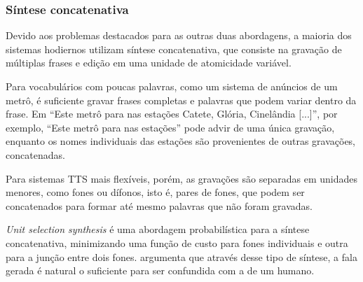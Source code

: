 
\subsubsection{Síntese concatenativa}
Devido aos problemas destacados para as outras duas abordagens, a maioria dos
sistemas hodiernos utilizam síntese concatenativa, que consiste na gravação de
múltiplas frases e edição em uma unidade de atomicidade variável.

Para vocabulários com poucas palavras, como um sistema de anúncios de um metrô, é
suficiente gravar frases completas e palavras que podem variar dentro da frase. Em
``Este metrô para nas estações Catete, Glória, Cinelândia [...]'', por exemplo,
``Este metrô para nas estações'' pode advir de uma única gravação, enquanto os nomes
individuais das estações são provenientes de outras gravações, concatenadas.

Para sistemas TTS mais flexíveis, porém, as gravações são separadas em unidades
menores, como fones ou dífonos, isto é, pares de fones, que podem ser
concatenados para formar até mesmo palavras que não foram gravadas.

\emph{Unit selection synthesis} é uma abordagem probabilística para a síntese
concatenativa, minimizando uma função de custo para fones individuais e outra
para a junção entre dois fones.  argumenta que através desse
tipo de síntese, a fala gerada é natural o suficiente para ser confundida com a
de um humano.



